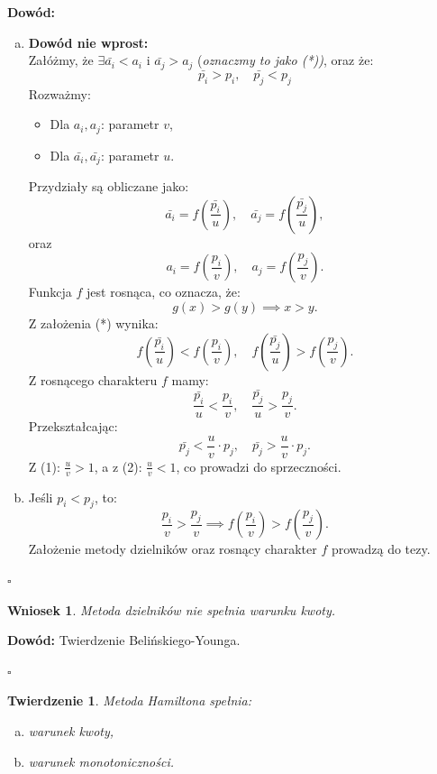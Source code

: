 \documentclass[12pt,a4paper]{article}
\theoremstyle{break}
\newtheorem{theorem}{Twierdzenie}[section]
\newtheorem{wniosek}{Wniosek}[theorem]
\begin{document}
	\noindent \textbf{Dowód:} 
	\begin{enumerate}[a)]
		\item \textbf{Dowód nie wprost:} \\
		Załóżmy, że $\exists \bar{a_i} < a_i$ i $\bar{a_j} > a_j$ (\textit{oznaczmy to jako (*))}, oraz że: 
		\[
		\bar{p_i} > p_i , \quad \bar{p_j} < p_j 
		\]
		Rozważmy:
		\begin{itemize}
			\item Dla $a_i, a_j$: parametr $v$,
			\item Dla $\bar{a_i}, \bar{a_j}$: parametr $u$.
		\end{itemize}
		Przydziały są obliczane jako:
		\[
		\bar{a_i} = f\left(\frac{\bar{p_i}}{u}\right), \quad \bar{a_j} = f\left(\frac{\bar{p_j}}{u}\right),
		\]
		oraz
		\[
		a_i = f\left(\frac{p_i}{v}\right), \quad a_j = f\left(\frac{p_j}{v}\right).
		\]
		Funkcja $f$ jest rosnąca, co oznacza, że:
		\[
		g(x) > g(y) \implies x > y.
		\]
		Z założenia (*) wynika:
		\[
		f\left(\frac{\bar{p_i}}{u}\right) < f\left(\frac{p_i}{v}\right), \quad f\left(\frac{\bar{p_j}}{u}\right) > f\left(\frac{p_j}{v}\right).
		\]
		Z rosnącego charakteru $f$ mamy:
		\[
		\frac{\bar{p_i}}{u} < \frac{p_i}{v}, \quad \frac{\bar{p_j}}{u} > \frac{p_j}{v}.
		\]
		Przekształcając:
		\[
		\bar{p_j} < \frac{u}{v} \cdot p_j, \quad \bar{p_j} > \frac{u}{v} \cdot p_j.
		\]
		Z (1): $\frac{u}{v} > 1$, a z (2): $\frac{u}{v} < 1$, co prowadzi do sprzeczności.
		
		\item Jeśli $p_i < p_j$, to:
		\[
		\frac{p_i}{v} > \frac{p_j}{v} \implies f\left(\frac{p_i}{v}\right) > f\left(\frac{p_j}{v}\right).
		\]
		Założenie metody dzielników oraz rosnący charakter $f$ prowadzą do tezy.
	\end{enumerate}
	\begin{flushright}
		$\square$
	\end{flushright}
	
	\begin{wniosek}
		Metoda dzielników nie spełnia warunku kwoty.
	\end{wniosek}
	
	\noindent \textbf{Dowód:} Twierdzenie Belińskiego-Younga.
	\begin{flushright}
		$\square$
	\end{flushright}
	
	\begin{theorem}
		Metoda Hamiltona spełnia:
		\begin{enumerate}[a)]
			\item warunek kwoty,
			\item warunek monotoniczności.
		\end{enumerate}
	\end{theorem}
	
\end{document}
